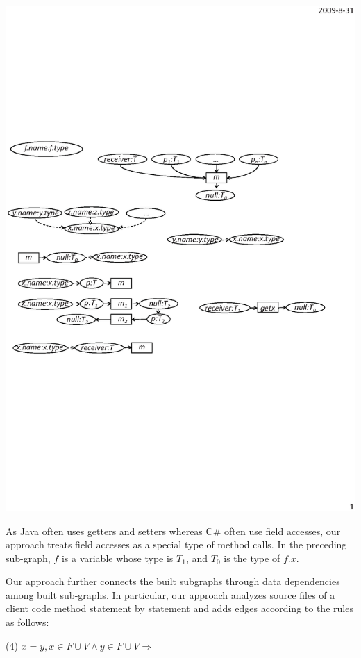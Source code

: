 \begin{center}
\includegraphics[scale=0.7,clip]{figure/rule3.eps}%
\end{center}

As Java often uses getters and setters whereas C\# often use field
accesses, our approach treats field accesses as a special type of
method calls. In the preceding sub-graph, $f$ is a variable whose
type is $T_1$, and $T_0$ is the type of $f.x$.


Our approach further connects the built subgraphs through data
dependencies among built sub-graphs. In particular, our approach
analyzes source files of a client code method statement by statement
and adds edges according to the rules as follows:

(4) $x=y, x\in F\cup V\wedge y\in F\cup V \Rightarrow $

